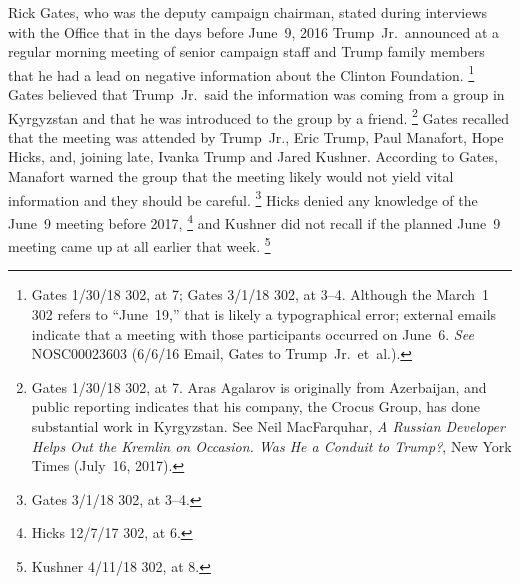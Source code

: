 Rick Gates, who was the deputy campaign chairman, stated during interviews with the Office that in the days before June~9, 2016 Trump~Jr.\ announced at a regular morning meeting of senior campaign staff and Trump family members that he had a lead on negative information about the Clinton Foundation.%
\footnote{Gates 1/30/18 302, at 7;
Gates 3/1/18 302, at 3--4.
Although the March~1 302 refers to “June~19,” that is likely a typographical error;
external emails indicate that a meeting with those participants occurred on June~6.
\textit{See} NOSC00023603 (6/6/16 Email, Gates to Trump~Jr.\ et~al.).}
Gates believed that Trump~Jr.\ said the information was coming from a group in Kyrgyzstan and that he was introduced to the group by a friend.%
\footnote{Gates 1/30/18 302, at 7.
Aras Agalarov is originally from Azerbaijan, and public reporting indicates that his company, the Crocus Group, has done substantial work in Kyrgyzstan.
See Neil MacFarquhar, \textit{A Russian Developer Helps Out the Kremlin on Occasion. Was He a Conduit to Trump?}, New York Times (July~16, 2017).}
Gates recalled that the meeting was attended by Trump~Jr., Eric Trump, Paul Manafort, Hope Hicks, and, joining late, Ivanka Trump and Jared Kushner.
According to Gates, Manafort warned the group that the meeting likely would not yield vital information and they should be careful.%
\footnote{Gates 3/1/18 302, at 3--4.}
Hicks denied any knowledge of the June~9 meeting before 2017,%
\footnote{Hicks 12/7/17 302, at 6.}
and Kushner did not recall if the planned June~9 meeting came up at all earlier that week.%
\footnote{Kushner 4/11/18 302, at 8.}

